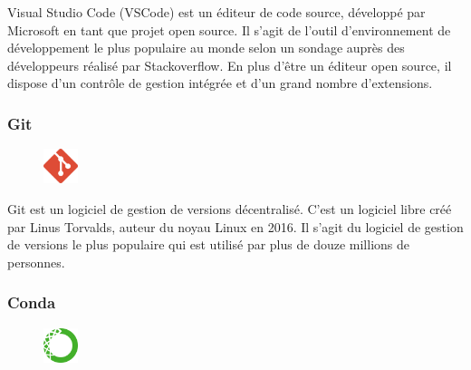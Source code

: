 Visual Studio Code (VSCode) est un éditeur de code source, développé par 
Microsoft en tant que projet open source. Il s’agit de l’outil d’environnement 
de développement le plus populaire au monde selon un sondage auprès des 
développeurs réalisé par Stackoverflow\cite{13}. En plus d’être un éditeur open 
source, il dispose d’un contrôle de gestion intégrée et d’un grand nombre 
d’extensions\cite{41}.

\subsubsection*{Git}
\begin{figure}
    \vspace{-28pt}
    \begin{center}
        \includegraphics[width=0.09\textwidth]{images/git logo.png}
        \label{fig67}
    \end{center}
    \vspace{-20pt}
    \vspace{-10pt}
\end{figure}   

Git est un logiciel de gestion de versions décentralisé. C’est un logiciel libre 
créé par Linus Torvalds, auteur du noyau Linux en 2016. Il s’agit du logiciel 
de gestion de versions le plus populaire qui est utilisé par plus de douze 
millions de personnes\cite{43}.

\subsubsection*{Conda}
\begin{figure}
    \vspace{-36pt}
    \begin{center}
        \includegraphics[width=0.09\textwidth]{images/Conda logo.png}
        \label{fig68}
    \end{center}
    \vspace{-20pt}
    \vspace{-10pt}
\end{figure}

